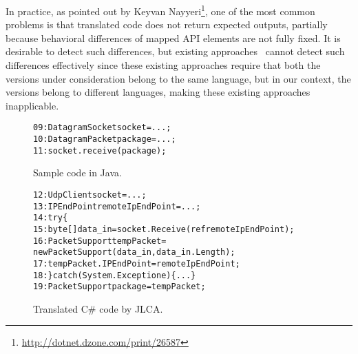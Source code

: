 In practice, as pointed out by Keyvan Nayyeri\footnote{\url{http://dotnet.dzone.com/print/26587}}, one of the most common problems is that translated code does not return expected outputs, partially because behavioral differences of mapped API elements are not fully fixed. It is desirable to detect such differences, but existing approaches~\cite{orso1using,jin2010automated} cannot detect such differences effectively since these existing approaches require that both the versions under consideration belong to the same language, but in our context, the versions belong to different languages, making these existing approaches inapplicable.
\begin{figure}[t]
\begin{CodeOut}%
\begin{alltt}
09: DatagramSocket socket = ...;
10: DatagramPacket package = ...;
11: socket.receive(package);
\end{alltt}
\end{CodeOut}\vspace*{-5ex}
\caption{Sample code in Java.}\vspace*{-2ex}
\label{fig:javacode}
\begin{CodeOut}%
\begin{alltt}
12: UdpClient socket = ...;
13: IPEndPoint remoteIpEndPoint = ...;
14: try\{
15:  byte[] data_in = socket.Receive(ref remoteIpEndPoint);
16:  PacketSupport tempPacket =
          new PacketSupport(data_in, data_in.Length);
17:   tempPacket.IPEndPoint = remoteIpEndPoint;
18: \} catch (System.Exception e)\{...\}
19: PacketSupport package = tempPacket;
\end{alltt}
\end{CodeOut}\vspace*{-5ex}
\caption{Translated C\# code by JLCA.}\vspace*{-5ex}
\label{fig:codeJLCA}
\end{figure}



